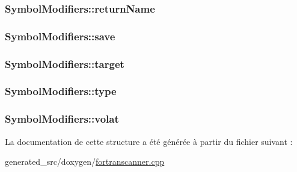 \subsubsection[{return\+Name}]{ Symbol\+Modifiers\+::return\+Name}\label{struct_symbol_modifiers_a7df57513685e3721861f65ba286952b1}
\hypertarget{struct_symbol_modifiers_a25d1321a621eb7496f4e2e3ac99b0842}{}
\subsubsection[{save}]{ Symbol\+Modifiers\+::save}\label{struct_symbol_modifiers_a25d1321a621eb7496f4e2e3ac99b0842}
\hypertarget{struct_symbol_modifiers_a10971e3ef27a2e20c71a769c6d237807}{}
\subsubsection[{target}]{ Symbol\+Modifiers\+::target}\label{struct_symbol_modifiers_a10971e3ef27a2e20c71a769c6d237807}
\hypertarget{struct_symbol_modifiers_a562bc973e362b8bf352c8bd8bd11d92b}{}
\subsubsection[{type}]{ Symbol\+Modifiers\+::type}\label{struct_symbol_modifiers_a562bc973e362b8bf352c8bd8bd11d92b}
\hypertarget{struct_symbol_modifiers_a6034722aa4017fca0054462b41b4aa97}{}
\subsubsection[{volat}]{ Symbol\+Modifiers\+::volat}\label{struct_symbol_modifiers_a6034722aa4017fca0054462b41b4aa97}


La documentation de cette structure a été générée à partir du fichier suivant \+:\begin{DoxyCompactItemize}
\item 
generated\+\_\+src/doxygen/\hyperlink{fortranscanner_8cpp}{fortranscanner.\+cpp}\end{DoxyCompactItemize}
